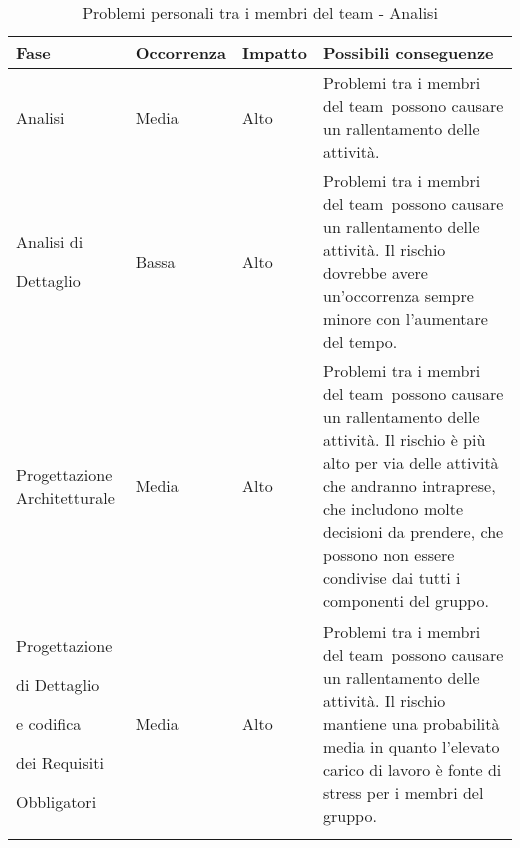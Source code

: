 \documentclass[../PianoProgetto.tex]{subfiles}
\begin{document}
	
	\hspace{0pt}
		\begin{longtabu} to \textwidth {X[.55] X[c .50] X[c .50] X}
			\toprule
			\textbf{Fase} & \textbf{Occorrenza} & \textbf{Impatto} & \textbf{Possibili conseguenze}\\
			\midrule
			\endhead
			
			Analisi & Media & Alto & Problemi tra i membri del team\g\ possono causare un rallentamento delle attività. \\
			\midrule
			Analisi di \par Dettaglio & Bassa & Alto & Problemi tra i membri del team\g\ possono causare un rallentamento delle attività. Il rischio dovrebbe avere un'occorrenza sempre minore con l'aumentare del tempo. \\
			\midrule
			Progettazione Architetturale & Media & Alto & Problemi tra i membri del team\g\ possono causare un rallentamento delle attività. Il rischio è più alto per via delle attività che andranno intraprese, che includono molte decisioni da prendere, che possono non essere condivise dai tutti i componenti del gruppo. \\
			\midrule
			Progettazione \par di Dettaglio \par e codifica \par dei Requisiti \par Obbligatori & Media & Alto & Problemi tra i membri del team\g\ possono causare un rallentamento delle attività. Il rischio mantiene una probabilità media in quanto l'elevato carico di lavoro è fonte di stress per i membri del gruppo.\\
			\bottomrule
		
		\caption{Problemi personali tra i membri del team - Analisi}
		\label{tab:Problemi personali tra i membri del team - Analisi}	
	\end{longtabu}
	
\end{document}
